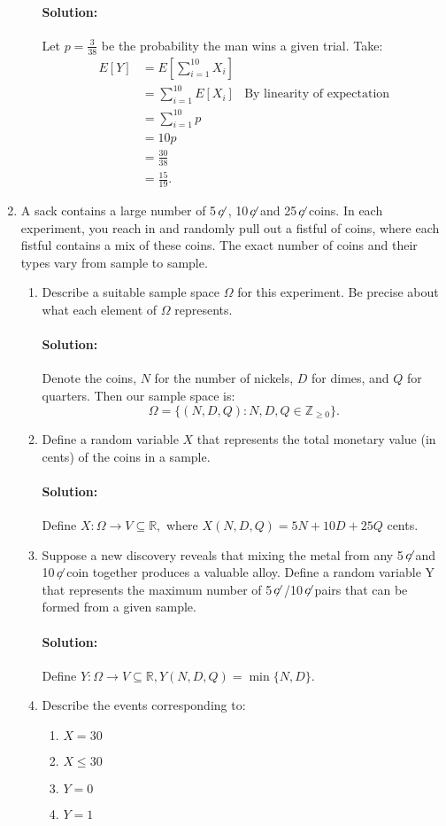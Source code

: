 \documentclass{article}
\newcommand{\cent}{\ensuremath{\,\not\!\!c\,\,}}
\begin{document}
\begin{enumerate}
\begin{enumerate}
        \paragraph{Solution: }Let $p=\frac{3}{38}$ 
        be the probability the man wins a given trial. Take:
        \begin{align*}
            E[Y]&=E\left[ \sum_{i=1}^{10} X_i \right] \\
                &= \sum_{i=1}^{10} E[X_i]&\text{By linearity of expectation} \\
                &= \sum_{i=1}^{10} p \\
                &= 10p \\
                &= \frac{30}{38}\\
                &= \frac{15}{19} 
        .\end{align*}
\end{enumerate}
\item A sack contains a large number of 5\cent, 10\cent and 25\cent coins. In each experiment, you reach in and randomly pull out a fistful of coins, where each fistful contains a mix of these coins. The exact number of coins and their types vary from sample to sample.
    \begin{enumerate}
    \item Describe a suitable sample space $\Omega$ for this experiment. Be precise about what each element of $\Omega$ represents.
        \paragraph{Solution: }Denote the coins, $N$ for the number of nickels, $D$ for dimes, and $Q $ for quarters. Then our sample space is:
        \[
        \Omega=\{(N,D,Q):N,D,Q\in \mathbb{Z}_{\ge 0}\} 
        .\] 
    \item Define a random variable $X$ that represents the total monetary value (in cents) of the coins in a sample.
        \paragraph{Solution: }Define $X:\Omega\to V\subseteq \mathbb{R},$ where $X(N,D,Q)=5N+10D+25Q$ cents.
    \item Suppose a new discovery reveals that mixing the metal from any 5\cent and 10\cent coin together produces a valuable alloy. Define a random variable Y that represents the maximum number of 5\cent/10\cent pairs that can be formed from a given sample.
        \paragraph{Solution: }Define $Y:\Omega\to V\subseteq \mathbb{R}, Y(N,D,Q)=\min \{N,D\} $.
    \item Describe the events corresponding to:
        \begin{enumerate}
            \item $X=30$
            \item $X \leq 30$
            \item $Y = 0$
            \item $Y = 1$
        \end{enumerate}

\end{enumerate}
\end{enumerate}
\end{document}
